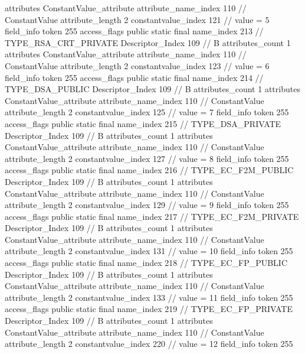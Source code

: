 {{{{{				attributes {
				ConstantValue_attribute {
					attribute_name_index	110		// ConstantValue
					attribute_length	2
					constantvalue_index	121		// value = 5
				}
				}
			}
			field_info {
				token	255
				access_flags	public static final
				name_index	213		// TYPE_RSA_CRT_PRIVATE
				Descriptor_Index	109		// B
				attributes_count	1
				attributes {
				ConstantValue_attribute {
					attribute_name_index	110		// ConstantValue
					attribute_length	2
					constantvalue_index	123		// value = 6
				}
				}
			}
			field_info {
				token	255
				access_flags	public static final
				name_index	214		// TYPE_DSA_PUBLIC
				Descriptor_Index	109		// B
				attributes_count	1
				attributes {
				ConstantValue_attribute {
					attribute_name_index	110		// ConstantValue
					attribute_length	2
					constantvalue_index	125		// value = 7
				}
				}
			}
			field_info {
				token	255
				access_flags	public static final
				name_index	215		// TYPE_DSA_PRIVATE
				Descriptor_Index	109		// B
				attributes_count	1
				attributes {
				ConstantValue_attribute {
					attribute_name_index	110		// ConstantValue
					attribute_length	2
					constantvalue_index	127		// value = 8
				}
				}
			}
			field_info {
				token	255
				access_flags	public static final
				name_index	216		// TYPE_EC_F2M_PUBLIC
				Descriptor_Index	109		// B
				attributes_count	1
				attributes {
				ConstantValue_attribute {
					attribute_name_index	110		// ConstantValue
					attribute_length	2
					constantvalue_index	129		// value = 9
				}
				}
			}
			field_info {
				token	255
				access_flags	public static final
				name_index	217		// TYPE_EC_F2M_PRIVATE
				Descriptor_Index	109		// B
				attributes_count	1
				attributes {
				ConstantValue_attribute {
					attribute_name_index	110		// ConstantValue
					attribute_length	2
					constantvalue_index	131		// value = 10
				}
				}
			}
			field_info {
				token	255
				access_flags	public static final
				name_index	218		// TYPE_EC_FP_PUBLIC
				Descriptor_Index	109		// B
				attributes_count	1
				attributes {
				ConstantValue_attribute {
					attribute_name_index	110		// ConstantValue
					attribute_length	2
					constantvalue_index	133		// value = 11
				}
				}
			}
			field_info {
				token	255
				access_flags	public static final
				name_index	219		// TYPE_EC_FP_PRIVATE
				Descriptor_Index	109		// B
				attributes_count	1
				attributes {
				ConstantValue_attribute {
					attribute_name_index	110		// ConstantValue
					attribute_length	2
					constantvalue_index	220		// value = 12
				}
				}
			}
			field_info {
				token	255
}}}}}
